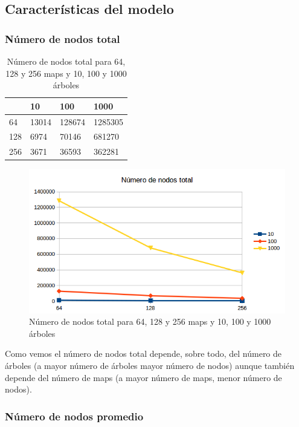 \newpage
\subsection{Características del modelo}

\subsubsection{Número de nodos total}

\begin{table}[H]
	\centering
	\caption{Número de nodos total para 64, 128 y 256 maps y 10, 100 y 1000 árboles}
	\label{tab:nodos-total}
	\begin{tabular}{l|lll|}
		\cline{2-4}
		& 10    & 100    & 1000    \\ \hline
		\multicolumn{1}{|l|}{64}  & 13014 & 128674 & 1285305 \\
		\multicolumn{1}{|l|}{128} & 6974  & 70146  & 681270  \\
		\multicolumn{1}{|l|}{256} & 3671  & 36593  & 362281  \\ \hline
	\end{tabular}
\end{table}

\begin{figure}[H]
	\centering
	\includegraphics[width=12cm]{img/nodos-total}
	\caption{Número de nodos total para 64, 128 y 256 maps y 10, 100 y 1000 árboles}
	\label{fig:nodos-total}
\end{figure}

Como vemos el número de nodos total depende, sobre todo, del número de árboles (a mayor número de árboles mayor número de nodos) aunque también depende del número de maps (a mayor número de maps, menor número de nodos).

\newpage
\subsubsection{Número de nodos promedio}

